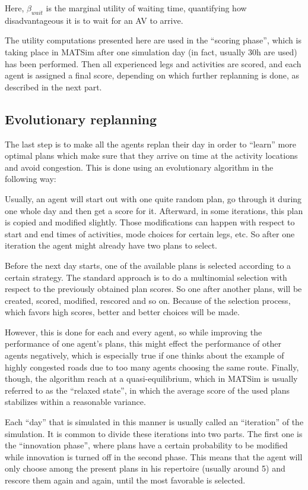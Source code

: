 Here, $\beta_{wait}$ is the marginal utility of waiting time, quantifying
how disadvantageous it is to wait for an AV to arrive.

The utility computations presented here are used in the ``scoring phase'', which
is taking place in MATSim after one simulation day (in fact, usually 30h are
used) has been performed. Then all experienced legs and activities are scored, and
each agent is assigned a final score, depending on which further replanning is done,
as described in the next part.

\subsection{Evolutionary replanning}

The last step is to make all the agents replan their day
in order to ``learn'' more optimal plans which
make sure that they arrive on time at the activity locations and avoid congestion.
This is done using an evolutionary algorithm in the following way:

Usually, an agent will start out with one quite random plan, go through it during
one whole day and then get a score for it. Afterward, in some iterations, this
plan is copied and modified slightly. Those modifications can happen with respect
to start and end times of activities, mode choices for certain legs, etc. So after
one iteration the agent might already have two plans to select.

Before the next day starts, one of the available plans is selected according to a certain
strategy. The standard approach is to do a multinomial selection with respect to
the previously obtained plan scores. So one after another plans, will be created,
scored, modified, rescored and so on. Because of the selection process, which
favors high scores, better and better choices will be made.

However, this is done for each and every agent, so while improving the performance
of one agent's plans, this might effect the performance of other agents negatively,
which is especially true if one thinks about the example of highly congested roads
due to too many agents choosing the same route. Finally, though, the algorithm reach
at a quasi-equilibrium, which in MATSim is usually referred to as the ``relaxed
state'', in which the average score of the used plans stabilizes within a
reasonable variance.

Each ``day'' that is simulated in this manner is usually called an ``iteration''
of the simulation. It is common to divide these iterations into two parts. The
first one is the ``innovation phase'', where plans have a certain probability to
be modified while innovation is turned off in the second phase. This means that
the agent will only choose among the present plans in his repertoire (usually
around 5) and rescore them again and again, until the most favorable is selected.

